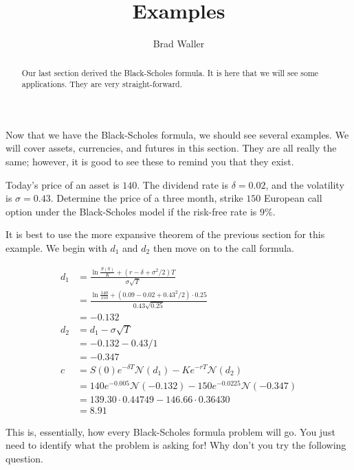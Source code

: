 \documentclass{ximera}
\author{Brad Waller}
\title{Examples}
\begin{document}
\begin{abstract}
Our last section derived the Black-Scholes formula. It is here that we will see some applications. They are very straight-forward.
\end{abstract}

\maketitle

Now that we have the Black-Scholes formula, we should see several examples. We will cover assets, currencies, and futures in this section. They are all really the same; however, it is good to see these to remind you that they exist.

\begin{example}
Today's price of an asset is $140$. The dividend rate is $\delta=0.02$, and the volatility is $\sigma=0.43$. Determine the price of a three month, strike $150$ European call option under the Black-Scholes model if the risk-free rate is $9\%$.
\end{example}

\begin{solution}
It is best to use the more expansive theorem of the previous section for this example. We begin with $d_1$ and $d_2$ then move on to the call formula.

	\begin{align*}
	d_1 	&=\frac{\ln\frac{S(0)}{K}+(r-\delta+\sigma^2/2)T}{\sigma\sqrt{T}}\\
		&=\frac{\ln\frac{140}{150}+(0.09-0.02+0.43^2/2)\cdot 0.25}{0.43\sqrt{0.25}}\\
		&=-0.132\\
	d_2 	&=d_1-\sigma\sqrt{T}\\
		&=-0.132-0.43/1\\
		&=-0.347\\
	c 	&=S(0)e^{-\delta T}\mathcal{N}(d_1)-Ke^{-rT}\mathcal{N}(d_2)\\
		&=140e^{-0.005}\mathcal{N}(-0.132)-150e^{-0.0225}\mathcal{N}(-0.347)\\
		&=139.30\cdot 0.44749 - 146.66 \cdot 0.36430\\
		&=8.91
	\end{align*}
\end{solution}

This is, essentially, how every Black-Scholes formula problem will go. You just need to identify what the problem is asking for! Why don't you try the following question.
\end{document}
